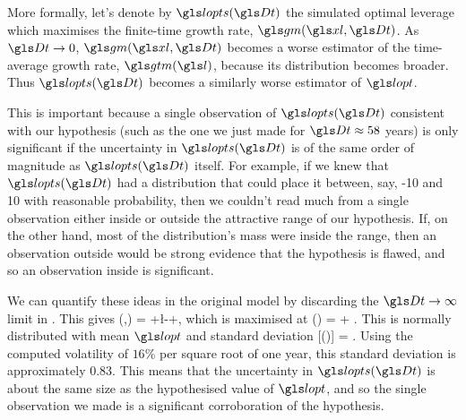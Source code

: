More formally, let's denote by $\lopts(\Dt)$ the simulated optimal leverage which maximises the finite-time growth rate, $\gm(\xl,\Dt)$. As $\Dt\to0$, $\gm(\xl,\Dt)$ becomes a worse estimator of the time-average growth rate, $\gtm(\l)$, because its distribution becomes broader. Thus $\lopts(\Dt)$ becomes a similarly worse estimator of $\lopt$. 

This is important because a single observation of $\lopts(\Dt)$ consistent with our hypothesis (such as the one we just made for $\Dt\approx58$ years) is only significant if the uncertainty in $\lopts(\Dt)$ is of the same order of magnitude as $\lopts(\Dt)$ itself. For example, if we knew that $\lopts(\Dt)$ had a distribution that could place it between, say, -10 and 10 with reasonable probability, then we couldn't read much from a single observation either inside or outside the attractive range of our hypothesis. If, on the other hand, most of the distribution's mass were inside the range, then an observation outside would be strong evidence that the hypothesis is flawed, and so an observation inside is significant.

We can quantify these ideas in the original model by discarding the $\Dt\to\infty$ limit in . This gives
\be
\gm(\xl,\Dt) = \mur+\l\mue-+\frac{\l\sigmas \gW(\Dt)}{\Dt},
\ee
which is maximised at
\be
\lopts(\Dt) = \lopt + \frac{\gW(\Dt)}{\sigmas\Dt}.
\ee
This is normally distributed with mean $\lopt$ and standard deviation
\be
{}[\lopts(\Dt)] = .
\ee
Using the computed volatility of $16\%$ per square root of one year, this standard deviation is approximately 0.83. This means that the uncertainty in $\lopts(\Dt)$ is about the same size as the hypothesised value of $\lopt$, and so the single observation we made is a significant corroboration of the hypothesis.


